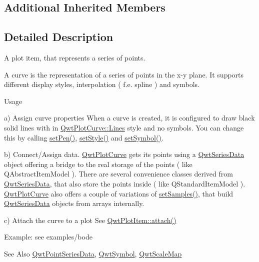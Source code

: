 \subsection*{Additional Inherited Members}


\subsection{Detailed Description}
A plot item, that represents a series of points. 

A curve is the representation of a series of points in the x-\/y plane. It supports different display styles, interpolation ( f.\-e. spline ) and symbols.

\begin{DoxyParagraph}{Usage}

\begin{DoxyDescription}
\item[a) Assign curve properties ]When a curve is created, it is configured to draw black solid lines with in \hyperlink{class_qwt_plot_curve_a15998aa80a11ba6ba80eebabaf773f70a8914d88bcd5f680e7091469fed67c9ba}{Qwt\-Plot\-Curve\-::\-Lines} style and no symbols. You can change this by calling \hyperlink{class_qwt_plot_curve_a08328abaf2c3b67e479d1e485d2d0c4d}{set\-Pen()}, \hyperlink{class_qwt_plot_curve_a2de41014c2b87fd459d0c438a15dd33e}{set\-Style()} and \hyperlink{class_qwt_plot_curve_aa66020b4a0fd8dd500acd93d17d1d1a4}{set\-Symbol()}. 
\item[b) Connect/\-Assign data. ]\hyperlink{class_qwt_plot_curve}{Qwt\-Plot\-Curve} gets its points using a \hyperlink{class_qwt_series_data}{Qwt\-Series\-Data} object offering a bridge to the real storage of the points ( like Q\-Abstract\-Item\-Model ). There are several convenience classes derived from \hyperlink{class_qwt_series_data}{Qwt\-Series\-Data}, that also store the points inside ( like Q\-Standard\-Item\-Model ). \hyperlink{class_qwt_plot_curve}{Qwt\-Plot\-Curve} also offers a couple of variations of \hyperlink{class_qwt_plot_curve_aa51cd3fa00f2a046ca5a9889c5db2413}{set\-Samples()}, that build \hyperlink{class_qwt_series_data}{Qwt\-Series\-Data} objects from arrays internally. 
\item[c) Attach the curve to a plot ]See \hyperlink{class_qwt_plot_item_aeb2f676533ccae3436bf578824e2165e}{Qwt\-Plot\-Item\-::attach()} 
\end{DoxyDescription}
\end{DoxyParagraph}
\begin{DoxyParagraph}{Example\-:}
see examples/bode
\end{DoxyParagraph}
\begin{DoxySeeAlso}{See Also}
\hyperlink{class_qwt_point_series_data}{Qwt\-Point\-Series\-Data}, \hyperlink{class_qwt_symbol}{Qwt\-Symbol}, \hyperlink{class_qwt_scale_map}{Qwt\-Scale\-Map} 
\end{DoxySeeAlso}


